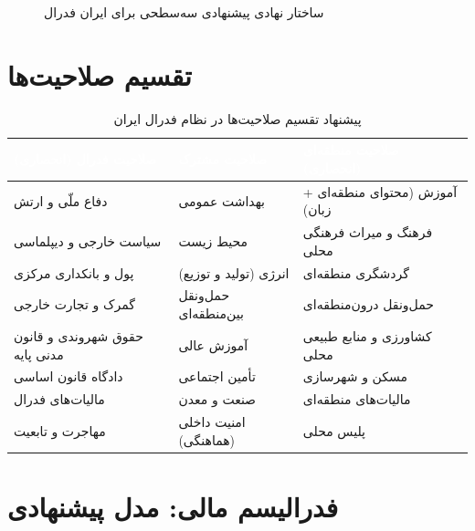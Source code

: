\begin{figure}[htbp]
\caption{ساختار نهادی پیشنهادی سه‌سطحی برای ایران فدرال}
\label{fig:proposed-structure}
\end{figure}

\section{تقسیم صلاحیت‌ها}

\begin{table}
\centering
\caption{پیشنهاد تقسیم صلاحیت‌ها در نظام فدرال ایران}
\label{tab:competence-division}
\small
{}
\begin{tabularx}{\linewidth}{
  >{\raggedright\arraybackslash}X
  >{\raggedright\arraybackslash}X
  >{\raggedright\arraybackslash}X
}
\toprule
\rowcolor{PrimaryDark}
\textcolor{white}{\bfseries صلاحیت فدرال (انحصاری)} &
\textcolor{white}{\bfseries صلاحیت مشترک} &
\textcolor{white}{\bfseries صلاحیت منطقه‌ای (انحصاری)} \\
\midrule
دفاع ملّی و ارتش &
بهداشت عمومی &
آموزش (محتوای منطقه‌ای + زبان) \\
سیاست خارجی و دیپلماسی &
محیط زیست &
فرهنگ و میراث فرهنگی محلی \\
پول و بانکداری مرکزی &
انرژی (تولید و توزیع) &
گردشگری منطقه‌ای \\
گمرک و تجارت خارجی &
حمل‌ونقل بین‌منطقه‌ای &
حمل‌ونقل درون‌منطقه‌ای \\
حقوق شهروندی و قانون مدنی پایه &
آموزش عالی &
کشاورزی و منابع طبیعی محلی \\
دادگاه قانون اساسی &
تأمین اجتماعی &
مسکن و شهرسازی \\
مالیات‌های فدرال &
صنعت و معدن &
مالیات‌های منطقه‌ای \\
مهاجرت و تابعیت &
امنیت داخلی (هماهنگی) &
پلیس محلی \\
\bottomrule
\end{tabularx}
\end{table}

\section{فدرالیسم مالی: مدل پیشنهادی}

